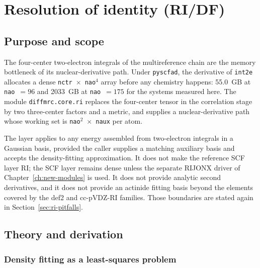 \chapter{Resolution of identity (RI/DF)}
\label{ch:ri-df}

\section{Purpose and scope}

The four-center two-electron integrals of the multireference chain are
the memory bottleneck of its nuclear-derivative path.  Under
\texttt{pyscfad}, the derivative of \texttt{int2e} allocates a dense
\texttt{nctr}~$\times$~\texttt{nao}$^4$ array before any chemistry
happens: 55.0~GB at \texttt{nao}~$=96$ and 2033~GB at \texttt{nao}~$=175$
for the systems measured here.  The module \texttt{diffmrc.core.ri}
replaces the four-center tensor in the correlation stage by two
three-center factors and a metric, and supplies a nuclear-derivative
path whose working set is \texttt{nao}$^2$~$\times$~\texttt{naux} per
atom.

The layer applies to any energy assembled from two-electron integrals
in a Gaussian basis, provided the caller supplies a matching auxiliary
basis and accepts the density-fitting approximation.  It does not
make the reference SCF layer RI; the SCF layer remains dense unless the
separate RIJONX driver of Chapter~\ref{ch:new-modules} is used.  It
does not provide analytic second derivatives, and it does not provide
an actinide fitting basis beyond the elements covered by the def2 and
cc-pVDZ-RI families.  Those boundaries are stated again in
Section~\ref{sec:ri-pitfalls}.

\section{Theory and derivation}
\label{sec:ri-theory}

\subsection{Density fitting as a least-squares problem}

